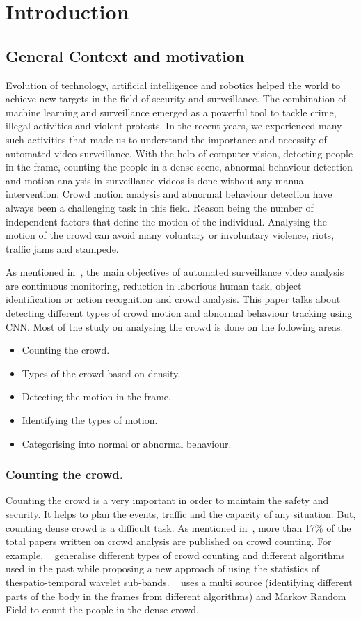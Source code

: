 \chapter{Introduction}
\section{General Context and motivation}
Evolution of technology, artificial intelligence and robotics helped the world to achieve new targets in the
field of security and surveillance. The combination of machine learning and surveillance emerged as a
powerful tool to tackle crime, illegal activities and violent protests. In the recent years, we experienced 
many such activities that made us to understand the importance and necessity of automated video 
surveillance. With the help of computer vision, detecting people in the frame, counting the people in a 
dense scene, abnormal behaviour detection and motion analysis in surveillance videos is done without 
any manual intervention. Crowd motion analysis and abnormal behaviour detection have always been a 
challenging task in this field. Reason being the number of independent factors that define the motion of 
the individual. Analysing the motion of the crowd can avoid many voluntary or involuntary violence, riots, 
traffic jams and stampede.

As mentioned in~\cite{sreenu2019intelligent}, the main objectives of automated surveillance video 
analysis are continuous monitoring, reduction in laborious human task, object identification or action 
recognition and crowd analysis. This paper talks about detecting different types of crowd motion and 
abnormal behaviour tracking using CNN. Most of the study on analysing the crowd is done on the following areas.
\begin{itemize}
	\item Counting the crowd.
	\item Types of the crowd based on density.
	\item Detecting the motion in the frame.
	\item Identifying the types of motion.
	\item Categorising into normal or abnormal behaviour.
\end{itemize}

\subsection{Counting the crowd.}
Counting the crowd is a very important in order to maintain the safety and security. It helps to plan the 
events, traffic and the capacity of any situation. But, counting dense crowd is a difficult task. As 
mentioned in~\cite{tripathi2019convolutional}, more than 17\% of the total papers written on crowd 
analysis are published on crowd counting. For example, ~\cite{8462345} generalise different types of 
crowd counting and different algorithms used in the past while proposing a new approach of using the 
statistics of thespatio-temporal wavelet sub-bands. ~\cite{idrees2013multi} uses a multi source (identifying different parts of the body in the frames from different algorithms) and Markov Random Field to count the people in the dense crowd.
